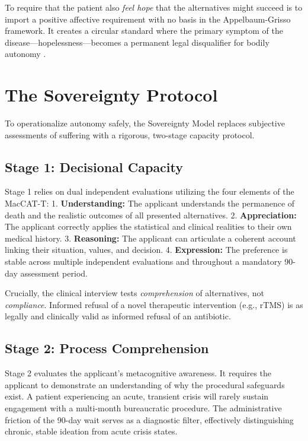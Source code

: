 \documentclass[10pt, twocolumn, letterpaper]{article}
\begin{document}
To require that the patient also \textit{feel hope} that the alternatives might succeed is to import a positive affective requirement with no basis in the Appelbaum-Grisso framework. It creates a circular standard where the primary symptom of the disease---hopelessness---becomes a permanent legal disqualifier for bodily autonomy \cite{donnelly2024}.

\section{The Sovereignty Protocol}

To operationalize autonomy safely, the Sovereignty Model replaces subjective assessments of suffering with a rigorous, two-stage capacity protocol.

\subsection{Stage 1: Decisional Capacity}

Stage 1 relies on dual independent evaluations utilizing the four elements of the MacCAT-T:
1. \textbf{Understanding:} The applicant understands the permanence of death and the realistic outcomes of all presented alternatives.
2. \textbf{Appreciation:} The applicant correctly applies the statistical and clinical realities to their own medical history.
3. \textbf{Reasoning:} The applicant can articulate a coherent account linking their situation, values, and decision.
4. \textbf{Expression:} The preference is stable across multiple independent evaluations and throughout a mandatory 90-day assessment period.

Crucially, the clinical interview tests \textit{comprehension} of alternatives, not \textit{compliance}. Informed refusal of a novel therapeutic intervention (e.g., rTMS) is as legally and clinically valid as informed refusal of an antibiotic.

\subsection{Stage 2: Process Comprehension}

Stage 2 evaluates the applicant's metacognitive awareness. It requires the applicant to demonstrate an understanding of why the procedural safeguards exist. A patient experiencing an acute, transient crisis will rarely sustain engagement with a multi-month bureaucratic procedure. The administrative friction of the 90-day wait serves as a diagnostic filter, effectively distinguishing chronic, stable ideation from acute crisis states.
\end{document}
